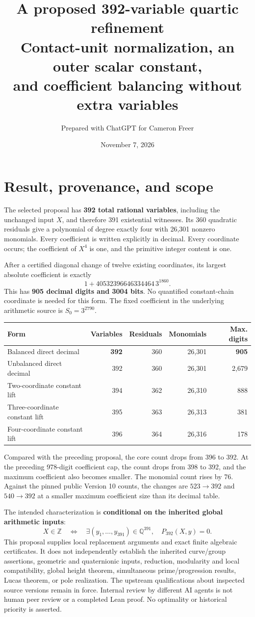 \documentclass[11pt]{article}
\title{A proposed 392-variable quartic refinement\\[5pt]
\large Contact-unit normalization, an outer scalar constant,\\
and coefficient balancing without extra variables}
\author{Prepared with ChatGPT for Cameron Freer}
\date{November 7, 2026}
\newcommand{\Q}{\mathbb Q}\newcommand{\Z}{\mathbb Z}
\begin{document}
\maketitle\thispagestyle{empty}

\section{Result, provenance, and scope}

The selected proposal has \textbf{392 total rational variables}, including
the unchanged input $X$, and therefore 391 existential witnesses. Its
360 quadratic residuals give a polynomial of degree exactly four with
26,301 nonzero monomials. Every coefficient is written explicitly in
decimal. Every coordinate occurs; the coefficient of $X^4$ is one,
and the primitive integer content is one.

After a certified diagonal change of twelve existing coordinates, its
largest absolute coefficient is exactly
\[
 1+40532396646334464\,3^{1860}.
\]
This has \textbf{905 decimal digits and 3004 bits}. No quantified
constant-chain coordinate is needed for this form. The fixed coefficient
in the underlying arithmetic source is $S_0=3^{2790}$.

\begin{center}
\begin{tabular}{lrrrr}\toprule
Form & Variables & Residuals & Monomials & Max. digits\\\midrule
Balanced direct decimal &\textbf{392}&360&26,301&\textbf{905}\\
Unbalanced direct decimal &392&360&26,301&2,679\\
Two-coordinate constant lift &394&362&26,310&888\\
Three-coordinate constant lift &395&363&26,313&381\\
Four-coordinate constant lift &396&364&26,316&178\\\bottomrule
\end{tabular}
\end{center}

Compared with the preceding proposal, the core count drops from 396
to 392. At the preceding 978-digit coefficient cap, the count drops
from 398 to 392, and the maximum coefficient also becomes smaller.
The monomial count rises by 76. Against the pinned public Version 10
counts, the changes are $523\to392$ and $540\to392$ at a smaller
maximum coefficient size than its decimal table.

The intended characterization is \textbf{conditional on the inherited
global arithmetic inputs}:
\[
 X\in\Z\quad\Longleftrightarrow\quad
 \exists(y_1,\ldots,y_{391})\in\Q^{391},\quad P_{392}(X,y)=0.
\]
This proposal supplies local replacement arguments and exact finite
algebraic certificates. It does not independently establish the inherited
curve/group assertions, geometric and quaternionic inputs, reduction,
modularity and local compatibility, global height theorem, simultaneous
prime/progression results, Lucas theorem, or pole realization. The
upstream qualifications about inspected source versions remain in force.
Internal review by different AI agents is not human peer review or a
completed Lean proof. No optimality or historical priority is asserted.
\end{document}

